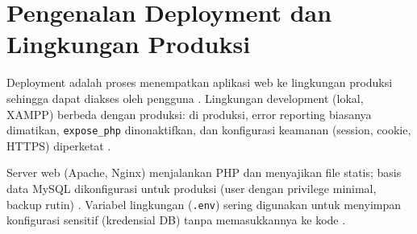 \section{Pengenalan Deployment dan Lingkungan Produksi}

Deployment adalah proses menempatkan aplikasi web ke lingkungan produksi sehingga dapat diakses oleh pengguna \cite{mdn-learn}. Lingkungan development (lokal, XAMPP) berbeda dengan produksi: di produksi, error reporting biasanya dimatikan, \texttt{expose\_php} dinonaktifkan, dan konfigurasi keamanan (session, cookie, HTTPS) diperketat \cite{php-right-way}.

Server web (Apache, Nginx) menjalankan PHP dan menyajikan file statis; basis data MySQL dikonfigurasi untuk produksi (user dengan privilege minimal, backup rutin) \cite{mysql}. Variabel lingkungan (\texttt{.env}) sering digunakan untuk menyimpan konfigurasi sensitif (kredensial DB) tanpa memasukkannya ke kode \cite{php-right-way}.
